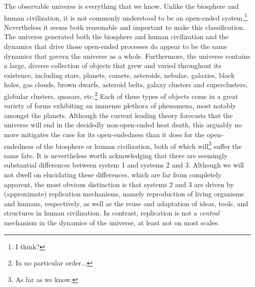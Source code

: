 \documentclass[12pt,letterpaper]{article}
\begin{document}
The observable universe is everything that we know. Unlike the biosphere and human civilization, it is not commonly understood to be an open-ended system.\footnote{I think?} Nevertheless it seems both reasonable and important to make this classification. The universe generated both the biosphere and human civilization and the dynamics that drive those open-ended processes do appear to be the same dynamics that govern the universe as a whole. Furthermore, the universe contains a large, diverse collection of objects that grew and varied throughout its existence, including stars, planets, comets, asteroids, nebulae, galaxies, black holes, gas clouds, brown dwarfs, asteroid belts, galaxy clusters and superclusters, globular clusters, quasars, etc.\footnote{In no particular order...} Each of these types of objects come in a great variety of forms exhibiting an immense plethora of phenomena, most notably amongst the planets. Although the current leading theory forecasts that the universe will end in the decidedly non-open-ended heat death, this arguably no more mitigates the case for its open-endedness than it does for the open-endedness of the biosphere or human civilization, both of which will\footnote{As far as we know.} suffer the same fate. It is nevertheless worth acknowledging that there are seemingly substantial differences between system 1 and systems 2 and 3. Although we will not dwell on elucidating these differences, which are far from completely apparent, the most obvious distinction is that systems 2 and 3 are driven by (approximate) replication mechanisms, namely reproduction of living organisms and humans, respectively, as well as the reuse and adaptation of ideas, tools, and structures in human civilization. In contrast, replication is not a {\em central} mechanism in the dynamics of the universe, at least not on most scales.

\end{document}
